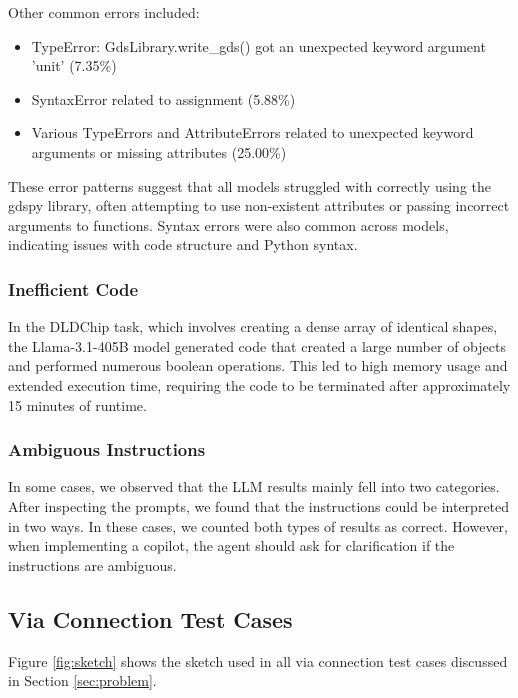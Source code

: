 \documentclass{article}
\begin{document}
Other common errors included:
\begin{itemize}
    \item TypeError: GdsLibrary.write\_gds() got an unexpected keyword argument 'unit' (7.35\%)
    \item SyntaxError related to assignment (5.88\%)
    \item Various TypeErrors and AttributeErrors related to unexpected keyword arguments or missing attributes (25.00\%)
\end{itemize}

These error patterns suggest that all models struggled with correctly using the gdspy library, often attempting to use non-existent attributes or passing incorrect arguments to functions. Syntax errors were also common across models, indicating issues with code structure and Python syntax.

\subsubsection{Inefficient Code}
\label{appendix:inefficient_code}

In the DLDChip task, which involves creating a dense array of identical shapes, the Llama-3.1-405B model generated code that created a large number of objects and performed numerous boolean operations. This led to high memory usage and extended execution time, requiring the code to be terminated after approximately 15 minutes of runtime.

\subsubsection{Ambiguous Instructions}
\label{appendix:ambiguous_instructions}

In some cases, we observed that the LLM results mainly fell into two categories. After inspecting the prompts, we found that the instructions could be interpreted in two ways. In these cases, we counted both types of results as correct. However, when implementing a copilot, the agent should ask for clarification if the instructions are ambiguous.

\subsection{Via Connection Test Cases}
\label{appendix:via_connection}

Figure \ref{fig:sketch} shows the sketch used in all via connection test cases discussed in Section \ref{sec:problem}.
\end{document}
